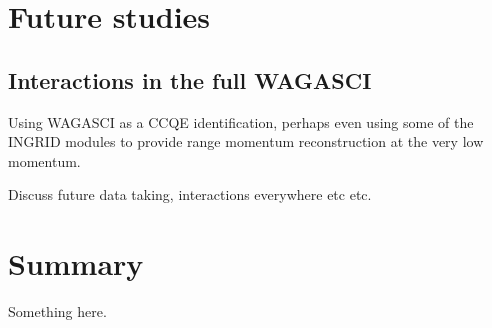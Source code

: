 \pagebreak
\section{Future studies}

\subsection{Interactions in the full WAGASCI}

Using WAGASCI as a CCQE identification, perhaps even using some of the INGRID modules to provide range momentum reconstruction at the very low momentum.










Discuss future data taking, interactions everywhere etc etc.



\section{Summary}
Something here.